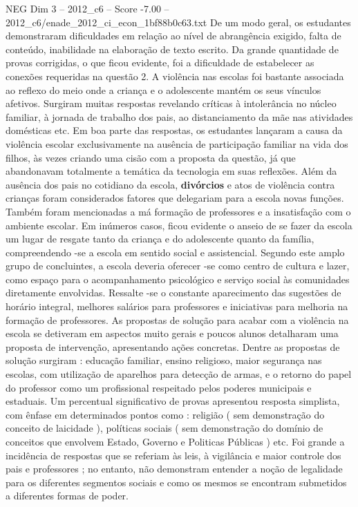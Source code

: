 \begin{textsample}{NEG Dim 3 – 2012\_c6 – Score -7.00 – 2012\_c6/enade\_2012\_ci\_econ\_1bf88b0c63.txt}
De um modo geral, os estudantes demonstraram dificuldades em relação ao nível de abrangência exigido, falta de conteúdo, inabilidade na elaboração de texto escrito.
Da grande quantidade de provas corrigidas, o que ficou evidente, foi a dificuldade de estabelecer as conexões requeridas na questão 2.
A violência nas escolas foi bastante associada ao reflexo do meio onde a criança e o adolescente mantém os seus vínculos afetivos.
Surgiram muitas respostas revelando críticas à intolerância no núcleo familiar, à jornada de trabalho dos pais, ao distanciamento da mãe nas atividades domésticas etc.
Em boa parte das respostas, os estudantes lançaram a causa da violência escolar exclusivamente na ausência de participação familiar na vida dos filhos, às vezes criando uma cisão com a proposta da questão, já que abandonavam totalmente a temática da tecnologia em suas reflexões.
Além da ausência dos pais no cotidiano da escola, \textbf{divórcios} e atos de violência contra crianças foram considerados fatores que delegariam para a escola novas funções.
Também foram mencionadas a má formação de professores e a insatisfação com o ambiente escolar.
Em inúmeros casos, ficou evidente o anseio de se fazer da escola um lugar de resgate tanto da criança e do adolescente quanto da família, compreendendo -se a escola em sentido social e assistencial.
Segundo este amplo grupo de concluintes, a escola deveria oferecer -se como centro de cultura e lazer, como espaço para o acompanhamento psicológico e serviço social às comunidades diretamente envolvidas.
Ressalte -se o constante aparecimento das sugestões de horário integral, melhores salários para professores e iniciativas para melhoria na formação de professores.
As propostas de solução para acabar com a violência na escola se detiveram em aspectos muito gerais e poucos alunos detalharam uma proposta de intervenção, apresentando ações concretas.
Dentre as propostas de solução surgiram : educação familiar, ensino religioso, maior segurança nas escolas, com utilização de aparelhos para detecção de armas, e o retorno do papel do professor como um profissional respeitado pelos poderes municipais e estaduais.
Um percentual significativo de provas apresentou resposta simplista, com ênfase em determinados pontos como : religião ( sem demonstração do conceito de laicidade ), políticas sociais ( sem demonstração do domínio de conceitos que envolvem Estado, Governo e Politicas Públicas ) etc.
Foi grande a incidência de respostas que se referiam às leis, à vigilância e maior controle dos pais e professores ; no entanto, não demonstram entender a noção de legalidade para os diferentes segmentos sociais e como os mesmos se encontram submetidos a diferentes formas de poder.

\end{textsample}
